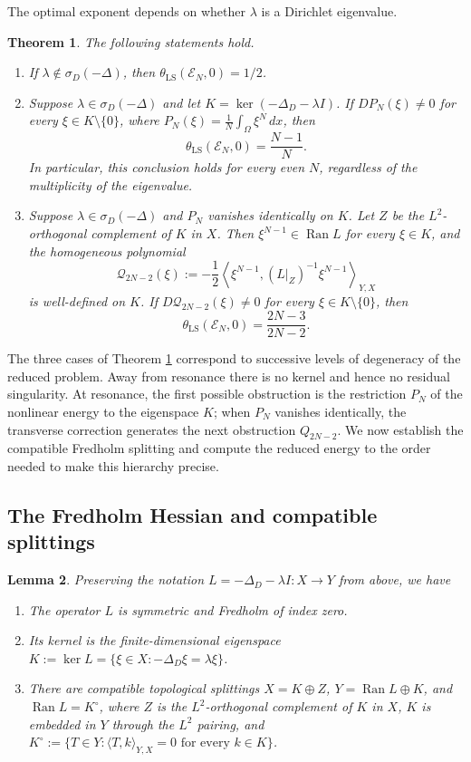 \documentclass[11pt]{article}
\newtheorem{theorem}{Theorem}[section]
\newtheorem{lemma}[theorem]{Lemma}
\theoremstyle{definition}
\theoremstyle{remark}
\begin{document}
\smallskip
The optimal exponent depends on whether $\lambda$ is a Dirichlet eigenvalue.
\begin{theorem} \label{thm:semilinear_exp}
The following statements hold.
\begin{enumerate}
\item If $\lambda\notin\sigma_D(-\Delta)$, then $\theta_{\mathrm{LS}}(\mathcal E_N,0)=1/2$.
\item Suppose $\lambda\in\sigma_D(-\Delta)$ and let $K=\ker(-\Delta_D-\lambda I)$. If $DP_N(\xi)\ne0$ for every $\xi\in K\setminus\{0\}$, where $P_N(\xi)=\frac1N\int_\Omega\xi^N\,dx$, then
$$
\theta_{\mathrm{LS}}(\mathcal E_N,0)=\frac{N-1}{N}.
$$
In particular, this conclusion holds for every even $N$, regardless of the multiplicity of the eigenvalue.
\item Suppose $\lambda\in\sigma_D(-\Delta)$ and $P_N$ vanishes identically on $K$. Let $Z$ be the $L^2$-orthogonal complement of $K$ in $X$. Then $\xi^{N-1}\in\operatorname{Ran}L$ for every $\xi\in K$, and the homogeneous polynomial
$$
\mathcal Q_{2N-2}(\xi):=-\frac12
\left\langle \xi^{N-1},(L|_Z)^{-1}\xi^{N-1}\right\rangle_{Y,X}
$$
is well-defined on $K$. If $D\mathcal Q_{2N-2}(\xi)\ne0$ for every $\xi\in K\setminus\{0\}$, then
$$
\theta_{\mathrm{LS}}(\mathcal E_N,0)=\frac{2N-3}{2N-2}.
$$
\end{enumerate}
\end{theorem}

The three cases of Theorem \ref{thm:semilinear_exp} correspond to successive levels of degeneracy of the reduced problem. Away from resonance there is no kernel and hence no residual singularity. At resonance, the first possible obstruction is the restriction $P_N$ of the nonlinear energy to the eigenspace $K$; when $P_N$ vanishes identically, the transverse correction generates the next obstruction $Q_{2N-2}$. We now establish the compatible Fredholm splitting and compute the reduced energy to the order needed to make this hierarchy precise.

\subsection{The Fredholm Hessian and compatible splittings}

\begin{lemma} \label{lem:compatible}
Preserving the notation $L=-\Delta_D-\lambda I:X\to Y$ from above, we have

\begin{enumerate}
\item The operator $L$ is symmetric and Fredholm of index zero.
\item Its kernel is the finite-dimensional eigenspace $K:=\ker L=\{\xi\in X:-\Delta_D\xi=\lambda\xi\}$.
\item There are compatible topological splittings $X=K\oplus Z$, $Y=\operatorname{Ran}L\oplus K$, and $\operatorname{Ran}L=K^\circ$, where $Z$ is the $L^2$-orthogonal complement of $K$ in $X$, $K$ is embedded in $Y$ through the $L^2$ pairing, and $K^\circ:=\{T\in Y:\langle T,k\rangle_{Y,X}=0\text{ for every }k\in K\}$.
\end{enumerate}
\end{lemma}
\end{document}

